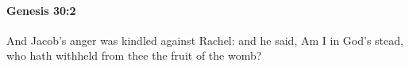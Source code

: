 
		\paragraph{Genesis 30:2} %
			\label{GENESIS-30-2}

			And Jacob's anger was kindled against Rachel: and he said, Am I in God's stead, who hath withheld from thee the fruit of the womb?


